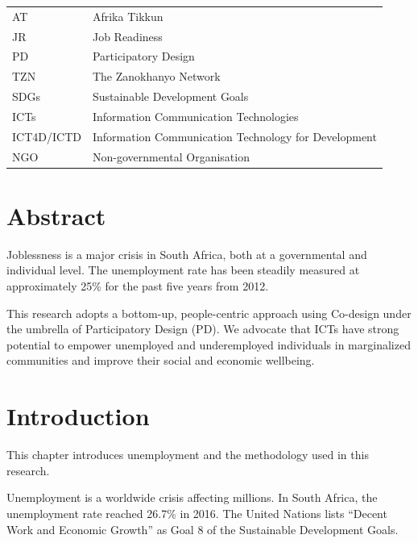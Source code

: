 \documentclass[12pt,a4paper]{report}
\begin{document}
\begin{longtable}{ll}
AT & Afrika Tikkun \\
JR & Job Readiness \\
PD & Participatory Design \\
TZN & The Zanokhanyo Network \\
SDGs & Sustainable Development Goals \\
ICTs & Information Communication Technologies \\
ICT4D/ICTD & Information Communication Technology for Development \\
NGO & Non-governmental Organisation \\
\end{longtable}


\chapter*{Abstract}

Joblessness is a major crisis in South Africa, both at a governmental and individual level. 
The unemployment rate has been steadily measured at approximately 25\% for the past five years from 2012.

This research adopts a bottom-up, people-centric approach using Co-design under the umbrella of Participatory Design (PD). 
We advocate that ICTs have strong potential to empower unemployed and underemployed individuals in marginalized communities and improve their social and economic wellbeing.


\tableofcontents
\clearpage
\listoffigures
\clearpage
\listoftables
\clearpage


\clearpage
{}

\chapter{Introduction}

This chapter introduces unemployment and the methodology used in this research.

Unemployment is a worldwide crisis affecting millions. 
In South Africa, the unemployment rate reached 26.7\% in 2016. 
The United Nations lists ``Decent Work and Economic Growth'' as Goal 8 of the Sustainable Development Goals.
\end{document}
